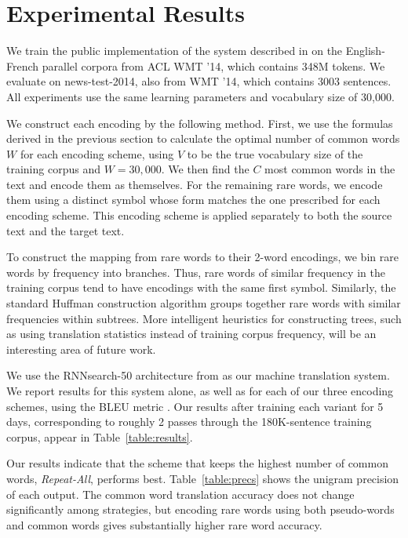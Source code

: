 \section{Experimental Results}
\label{sec:exp}

We train the public implementation of the system described in
 on the English-French parallel corpora
from ACL WMT '14, which contains 348M tokens. We evaluate on news-test-2014,
also from WMT '14, which contains 3003 sentences. All experiments use the same
learning parameters and vocabulary size of 30,000.

We construct each encoding by the following method. First, we use the formulas
derived in the previous section to calculate the optimal number of common words
$W$ for each encoding scheme, using $V$ to be the true vocabulary size of the
training corpus and $W = 30,000$. We then find the $C$ most common words in the
text and encode them as themselves. For the remaining rare words, we encode
them using a distinct symbol whose form matches the one prescribed for each
encoding scheme. This encoding scheme is applied separately to both the source
text and the target text.

To construct the mapping from rare words to their 2-word encodings, we bin rare
words by frequency into branches. Thus, rare words of similar frequency in the
training corpus tend to have encodings with the same first symbol. Similarly, the
standard Huffman construction algorithm groups together rare words with similar
frequencies within subtrees. More intelligent heuristics for constructing trees,
such as using translation statistics instead of training corpus frequency, will be
an interesting area of future work.

We use the RNNsearch-50 architecture from 
as our machine translation system. We report results for this system alone, as
well as for each of our three encoding schemes, using the BLEU metric
\cite{bleu}. Our results after training each variant for 5 days, corresponding to
roughly 2 passes through the 180K-sentence training corpus, appear in
Table~\ref{table:results}.

Our results indicate that the scheme that keeps the highest number of common
words, \emph{Repeat-All}, performs best. Table~\ref{table:precs} shows the
unigram precision of each output. The common word translation accuracy does not
change significantly among strategies, but encoding rare words using both
pseudo-words and common words gives substantially higher rare word accuracy.

